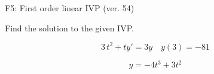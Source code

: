 \begin{exercise}
  \begin{exerciseTitle}F5: First order linear IVP (ver. 54)\end{exerciseTitle}
  \begin{exerciseStatement}
    
Find the solution to the given IVP.

    
\[3 \, t^{2} +ty'= 3 y \hspace{1em} y( 3 ) = -81\]

  \end{exerciseStatement}
  \begin{exerciseAnswer}
    
\[y= -4 t^ 3 +3 t^{2}\]

  \end{exerciseAnswer}
\end{exercise}